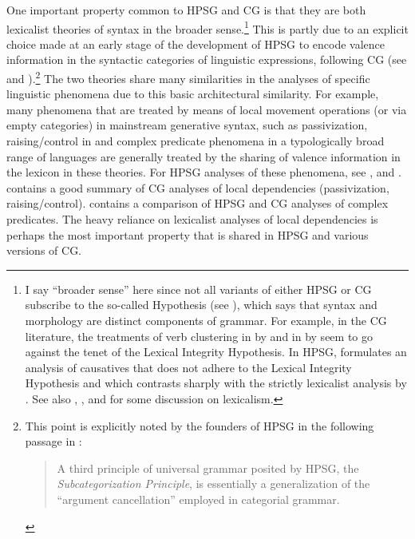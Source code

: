 \documentclass[output=paper,biblatex,babelshorthands,newtxmath,draftmode,colorlinks,citecolor=brown]{langscibook}
\begin{document}
One important property common to HPSG and CG is that they are both
lexicalist theories of syntax in the broader sense.\footnote{I say
``broader sense'' here since not all variants of either HPSG or CG subscribe to the
so-called  Hypothesis (see 
), which says that syntax and 
morphology are distinct components of grammar. For example, in the CG literature, 
the treatments of verb clustering in  by \citet{moortgatoehrle94} and
in  by \citet{Kubota2014a-u} seem to go against the tenet of
the Lexical Integrity Hypothesis. In HPSG,
\citet{Gunji99a-u} formulates an analysis of 
causatives that does not adhere to the Lexical Integrity Hypothesis and which 
contrasts sharply with the strictly lexicalist analysis by 
\citet{MSI99a}. 
See also , 
\citet{Bruening2018a, Bruening2018c-u}, \citet{MuellerLexicalism} and \citet{MWArgSt}
for some discussion on lexicalism.} 
This is partly due to an explicit choice made at an early
stage of the development of HPSG to encode valence information in the
syntactic categories of linguistic expressions, following CG
(see \crossrefchapteralt[\pageref{page-subcategorization-start}--\pageref{page-subcategorization-start}]{evolution} and ).\footnote{This
  point is explicitly noted by the founders of HPSG
  in the following passage in \citet{ps}:

\begin{quote}
A third principle of universal grammar posited by HPSG, the
\textit{Subcategorization Principle}, is essentially a generalization of the
``argument cancellation'' employed in categorial grammar. \hfill \citep[11]{ps}
\end{quote}

}
The two theories share many similarities in the
analyses of specific linguistic phenomena due to this basic
architectural similarity. For example, many phenomena that are treated
by means of local movement operations (or via empty categories) in
mainstream generative syntax, such as passivization, raising/control in 
and complex predicate phenomena in a typologically broad range of
languages are generally treated by the sharing of valence information
in the lexicon in these theories. For HPSG
analyses of these phenomena, see
,  
and .
\citet{steedman2011ccg} contains a good
summary of CG analyses of local dependencies 
(passivization, raising/control). \citet[Section~4.2]{Kubota2014a-u} contains
a comparison of HPSG and CG analyses of complex predicates.
The heavy reliance on lexicalist analyses of
local dependencies is perhaps the most important property that is shared in
HPSG and various versions of CG.
\end{document}
